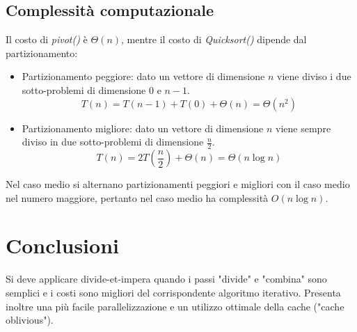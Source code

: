 \subsection{Complessit\`a computazionale}
Il costo di \emph{pivot()} \`e $\Theta(n)$, mentre il costo di \emph{Quicksort()} dipende dal partizionamento:
\begin{itemize}
\item Partizionamento peggiore: dato un vettore di dimensione $n$ viene diviso i due sotto-problemi di dimensione $0$ e $n-1$. $$T(n) = T(n-1) + T(0) + \Theta(n) = \Theta(n^2)$$
\item Partizionamento migliore: dato un vettore di dimensione $n$ viene sempre diviso in due sotto-problemi di dimensione $\frac{n}{2}$.  $$T(n) = 2T(\frac{n}{2}) + \Theta(n) = \Theta(n\log n)$$
\end{itemize}
Nel caso medio si alternano partizionamenti peggiori e migliori con il caso medio nel numero maggiore, pertanto nel caso medio ha complessit\`a $O(n\log n)$.
\section{Conclusioni}
Si deve applicare divide-et-impera quando i passi "divide" e "combina" sono semplici e i costi sono migliori del corrispondente algoritmo iterativo. Presenta inoltre una pi\`u facile parallelizzazione e un utilizzo
ottimale della cache ("cache oblivious"). 